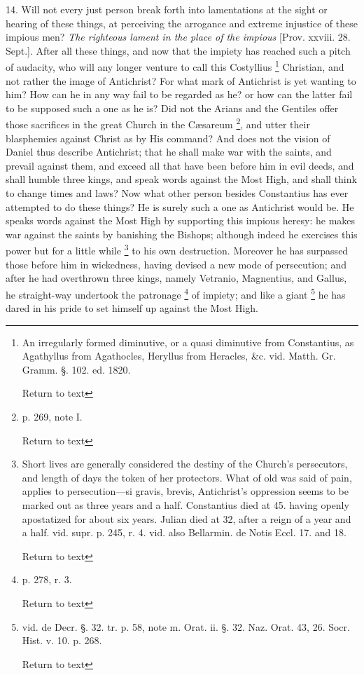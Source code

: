 14. Will not every just person break forth into
lamentations at the sight or hearing of these things, at perceiving
the arrogance and extreme injustice of these impious men? \emph{The
righteous lament in the place of the impious} [Prov. xxviii. 28.
Sept.]. After all these things, and now that the impiety has reached
such a pitch of audacity, who will any longer venture to call this
Costyllius \footnote{An irregularly formed diminutive, or a quasi
diminutive from Constantius, as Agathyllus from Agathocles, Heryllus
from Heracles, \&c. vid. Matth. Gr. Gramm. §. 102. ed. 1820.

Return to text} Christian, and not rather the image of Antichrist?
For what mark of Antichrist is yet wanting to him? How can he in any
way fail to be regarded as he? or how can the latter fail to be
supposed such a one as he is? Did not the Arians and the Gentiles
offer those sacrifices in the great Church in the Cæsareum \footnote{p. 269, note I.

Return to text},
and utter their blasphemies against Christ as by His command? And does
not the vision of Daniel thus describe Antichrist; that he shall make
war with the saints, and prevail against them, and exceed all that
have been before him in evil deeds, and shall humble three kings, and
speak words against the Most High, and shall think to change times and
laws? Now what other person besides Constantius has ever attempted to
do these things? He is surely such a one as Antichrist would be. He
speaks words against the Most High by supporting this impious
heresy: he makes war against the saints by banishing the Bishops;
although indeed he exercises this power but for a little while \footnote{Short lives are generally considered the
destiny of the Church's persecutors, and length of days the token of
her protectors. What of old was said of pain, applies to
persecution—si gravis, brevis, Antichrist's oppression seems to be
marked out as three years and a half. Constantius died at 45. having
openly apostatized for about six years. Julian died at 32, after a
reign of a year and a half. vid. supr. p. 245, r. 4. vid. also
Bellarmin. de Notis Eccl. 17. and 18.

Return to text} to his own destruction. Moreover he has surpassed those before him
in wickedness, having devised a new mode of persecution; and after he
had overthrown three kings, namely Vetranio, Magnentius, and Gallus,
he straight-way undertook the patronage \footnote{p. 278, r. 3.

Return to text} of impiety; and like
a giant \footnote{vid. de Decr. §. 32. tr. p. 58, note m. Orat.
ii. §. 32. Naz. Orat. 43, 26. Socr. Hist. v. 10. p. 268.

Return to text} he has dared in his pride to set himself up against
the Most High.

